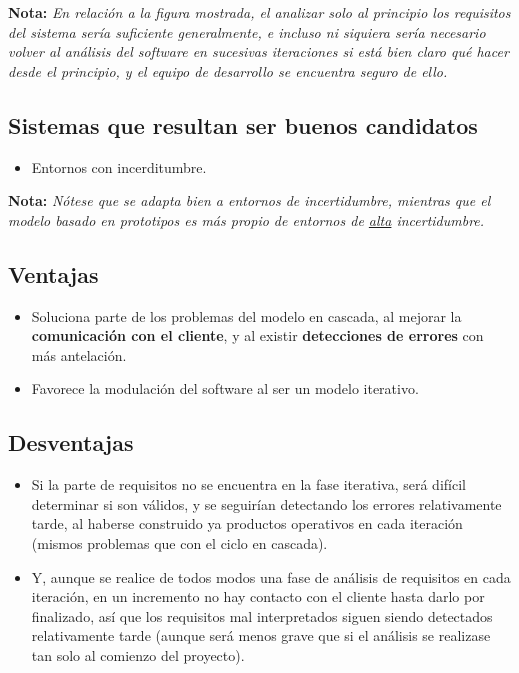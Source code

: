 \textbf{Nota:} \textit{En relación a la figura mostrada, el analizar solo al principio los requisitos del sistema sería suficiente generalmente, e incluso ni siquiera sería necesario volver al análisis del software en sucesivas iteraciones si está bien claro qué hacer desde el principio, y el equipo de desarrollo se encuentra seguro de ello.}

\subsection{Sistemas que resultan ser buenos candidatos}

\begin{itemize}
   \item Entornos con incerditumbre.
\end{itemize}

\textbf{Nota:} \textit{Nótese que se adapta bien a entornos de incertidumbre, mientras que el modelo basado en prototipos es más propio de entornos de \uline{alta} incertidumbre.}

\subsection{Ventajas}

\begin{itemize}
   \item Soluciona parte de los problemas del modelo en cascada, al mejorar la \textbf{comunicación con el cliente}, y al existir \textbf{detecciones de errores} con más antelación.
   \item Favorece la modulación del software al ser un modelo iterativo.
\end{itemize}

\subsection{Desventajas}

\begin{itemize}
   \item Si la parte de requisitos no se encuentra en la fase iterativa, será difícil determinar si son válidos, y se seguirían detectando los errores relativamente tarde, al haberse construido ya productos operativos en cada iteración (mismos problemas que con el ciclo en cascada).
   \item Y, aunque se realice de todos modos una fase de análisis de requisitos en cada iteración, en un incremento no hay contacto con el cliente hasta darlo por finalizado, así que los requisitos mal interpretados siguen siendo detectados relativamente tarde (aunque será menos grave que si el análisis se realizase tan solo al comienzo del proyecto).
\end{itemize}


